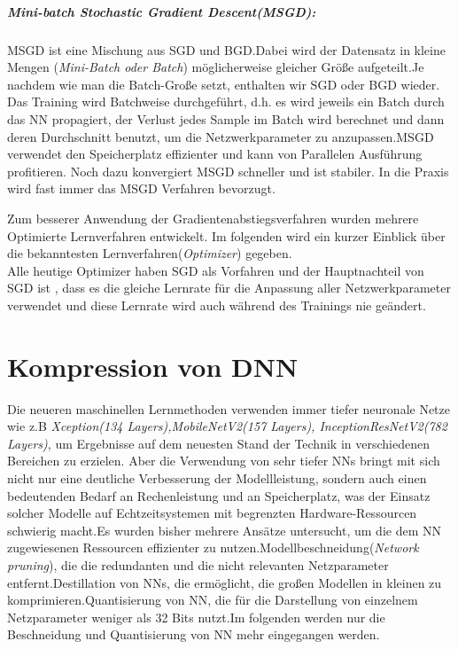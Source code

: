 \documentclass[12pt,a4paper]{scrartcl}
\numberwithin{equation}{section}
\begin{document}
\subparagraph{Mini-batch Stochastic Gradient Descent(MSGD): }
		MSGD ist eine Mischung aus SGD und BGD.Dabei wird der Datensatz in kleine Mengen (\textit{Mini-Batch oder Batch}) möglicherweise gleicher Größe aufgeteilt.Je nachdem wie man die Batch-Große setzt, enthalten wir SGD oder BGD wieder. Das Training wird Batchweise durchgeführt, d.h. es wird jeweils ein Batch durch das \ac{NN} propagiert, der Verlust jedes Sample im Batch wird berechnet und dann deren Durchschnitt benutzt, um die Netzwerkparameter zu anzupassen.MSGD verwendet den Speicherplatz effizienter und kann von Parallelen Ausführung profitieren. Noch  dazu konvergiert MSGD schneller und ist stabiler. In die Praxis wird fast immer das MSGD Verfahren bevorzugt.

Zum besserer Anwendung der Gradientenabstiegsverfahren wurden mehrere Optimierte Lernverfahren entwickelt. Im folgenden wird ein kurzer Einblick über die bekanntesten Lernverfahren(\textit{Optimizer})  gegeben.\\
Alle heutige Optimizer haben SGD als Vorfahren und der Hauptnachteil von SGD ist , dass es die gleiche Lernrate für die Anpassung aller Netzwerkparameter verwendet und diese Lernrate wird auch während des Trainings nie geändert. 



\section{Kompression von \ac{DNN}}
  Die neueren maschinellen Lernmethoden verwenden immer tiefer neuronale Netze wie z.B \textit{Xception(134 Layers),MobileNetV2(157 Layers), InceptionResNetV2(782 Layers)}, um Ergebnisse auf dem neuesten Stand der Technik in verschiedenen Bereichen zu erzielen. Aber die Verwendung von sehr tiefer \acsp{NN} bringt mit sich nicht nur eine deutliche Verbesserung der Modellleistung, sondern auch einen bedeutenden Bedarf an Rechenleistung und an Speicherplatz, was der Einsatz solcher Modelle auf Echtzeitsystemen mit begrenzten Hardware-Ressourcen schwierig macht.Es wurden bisher mehrere Ansätze untersucht, um die dem \ac{NN} zugewiesenen Ressourcen effizienter zu nutzen.Modellbeschneidung(\textit{Network pruning}), die die redundanten und  die nicht relevanten Netzparameter entfernt.Destillation von \acsp{NN}, die ermöglicht, die großen Modellen in kleinen  zu komprimieren.Quantisierung von \ac{NN}, die für die Darstellung von einzelnem Netzparameter weniger als 32 Bits nutzt.Im folgenden werden nur die Beschneidung und Quantisierung von \ac{NN} mehr eingegangen werden.
\end{document}

